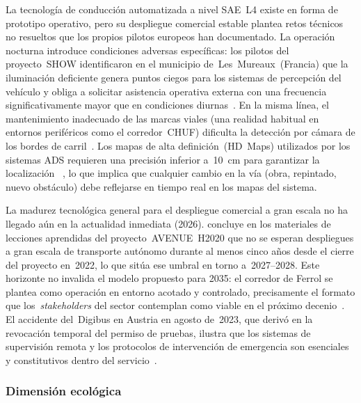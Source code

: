 La tecnología de conducción automatizada a nivel SAE~L4 existe en forma
de prototipo operativo, pero su despliegue comercial estable plantea
retos técnicos no resueltos que los propios pilotos europeos han
documentado. La operación nocturna introduce condiciones adversas
específicas: los pilotos del proyecto~SHOW identificaron en el municipio
de~Les~Mureaux~(Francia) que la iluminación deficiente genera puntos
ciegos para los sistemas de percepción del vehículo y obliga a solicitar
asistencia operativa externa con una frecuencia significativamente mayor
que en condiciones
diurnas~\parencite{SHOW2024Legacy}. En la misma línea, el
mantenimiento inadecuado de las marcas viales (una realidad habitual en
entornos periféricos como el corredor~CHUF) dificulta la detección por
cámara de los bordes de carril~\parencite{SHOWd812020}. Los mapas de alta
definición~(HD~Maps) utilizados por los sistemas ADS requieren una
precisión inferior a~10~cm para garantizar la localización
~\parencite{SHOWd812020}, lo que implica que cualquier cambio
en la vía (obra, repintado, nuevo obstáculo) debe reflejarse en tiempo
real en los mapas del sistema.

La madurez tecnológica general para el despliegue comercial a gran escala
no ha llegado aún en la actualidad inmediata (2026). \textcite{KonstantasAVENUE2023lessons} concluye en los
materiales de lecciones aprendidas del proyecto~AVENUE~H2020 que no se
esperan despliegues a gran escala de transporte autónomo durante al menos
cinco años desde el cierre del proyecto en~2022, lo que sitúa ese umbral
en torno a~2027–2028. Este horizonte no invalida el modelo propuesto para
2035: el corredor de Ferrol se plantea
como operación en entorno acotado y controlado, precisamente el formato
que los~\textit{stakeholders} del sector contemplan como viable en el
próximo decenio~\parencite{DibaGore2025}. El accidente del~Digibus en
Austria en agosto de~2023, que derivó en la revocación temporal del
permiso de pruebas, ilustra que los sistemas de supervisión remota y los
protocolos de intervención de emergencia son esenciales y
constitutivos dentro del
servicio~\parencite{SHOW2024Legacy}.

\subsubsection{Dimensión ecológica}
\label{sec:pestel-ecologica}

